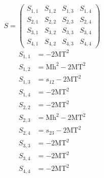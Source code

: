 \documentclass[a4paper]{article}
\begin{document}
\begin{equation}
S=\left(\begin{array}{cccc}
   S_{1,1}&
   S_{1,2}&
   S_{1,3}&
   S_{1,4}\\
   S_{2,1}&
   S_{2,2}&
   S_{2,3}&
   S_{2,4}\\
   S_{3,1}&
   S_{3,2}&
   S_{3,3}&
   S_{3,4}\\
   S_{4,1}&
   S_{4,2}&
   S_{4,3}&
   S_{4,4}\end{array}\right)
\end{equation}
\begin{subequations}
\begin{align}
   S_{1,1}&=-2\text{MT}^2\\
   S_{1,2}&=\text{Mh}^2-2\text{MT}^2\\
   S_{1,3}&=s_{12}-2\text{MT}^2\\
   S_{1,4}&=-2\text{MT}^2\\
   S_{2,2}&=-2\text{MT}^2\\
   S_{2,3}&=\text{Mh}^2-2\text{MT}^2\\
   S_{2,4}&=s_{23}-2\text{MT}^2\\
   S_{3,3}&=-2\text{MT}^2\\
   S_{3,4}&=-2\text{MT}^2\\
   S_{4,4}&=-2\text{MT}^2
\end{align}
\end{subequations}
\end{document}
